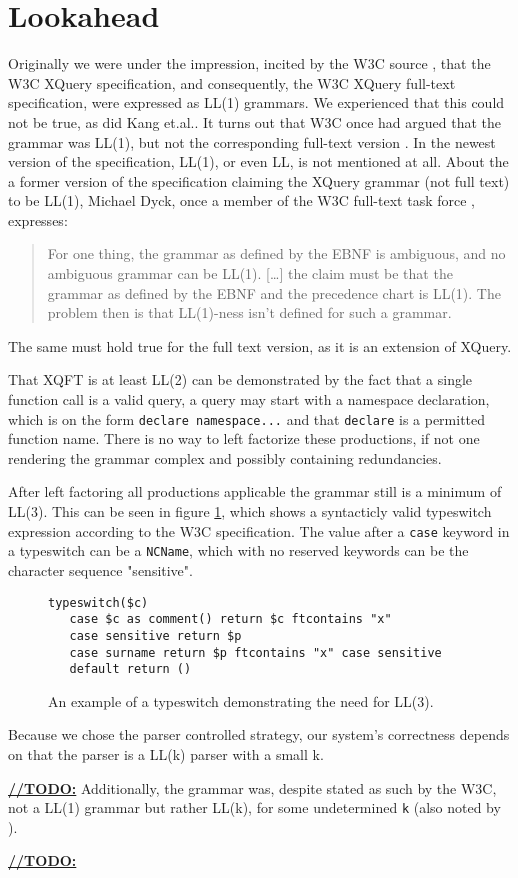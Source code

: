 \section{Lookahead}
\label{sect:discussion:lookahead}
Originally we were under the impression, incited by the W3C source \cite{createTokenizer}, that the W3C XQuery specification, and consequently, the W3C XQuery full-text specification, were expressed as LL(1) grammars. We experienced that this could not be true, as did Kang et.al.\cite{kang_xquery_diglib}. It turns out that W3C once had argued that the grammar was LL(1), but not the corresponding full-text version \cite{grammarIsLL1}. In the newest version of the specification, LL(1), or even LL, is not mentioned at all. About the a former version of the specification claiming the XQuery grammar (not full text) to be LL(1), Michael Dyck, once a member of the W3C full-text task force \cite{dyckIsTaskForce}, expresses\cite{dyckOnList}:
\begin{quote}
For one thing, the grammar as defined by the EBNF is ambiguous, and no ambiguous grammar can be LL(1). [\ldots] the claim must be that the grammar as defined by the EBNF and the precedence chart is LL(1). The problem then is that LL(1)-ness isn't defined for such a grammar.
\end{quote}
The same must hold true for the full text version, as it is an extension of XQuery.

That XQFT is at least LL(2) can be demonstrated by the fact that a single function call is a valid query, a query may start with a namespace declaration, which is on the form \verb!declare namespace...! and that \verb!declare! is a permitted function name. There is no way to left factorize these productions, if not one rendering the grammar complex and possibly containing redundancies.

After left factoring all productions applicable the grammar still is a minimum of LL(3). This can be seen in figure \ref{fig:notLL2}, which shows a syntacticly valid typeswitch expression according to the W3C specification. The value after a \verb!case! keyword in a typeswitch can be a \verb!NCName!, which with no reserved keywords can be the character sequence "sensitive".

\begin{figure}[h!]
\begin{Verbatim}
typeswitch($c) 
   case $c as comment() return $c ftcontains "x" 
   case sensitive return $p
   case surname return $p ftcontains "x" case sensitive
   default return ()
\end{Verbatim}
\label{fig:notLL2}
\caption[A typeswitch shows the need for LL(3)]{An example of a typeswitch demonstrating the need for LL(3).}
\end{figure}


Because we chose the parser controlled strategy, our system's correctness depends on that the parser is a LL(k) parser with a small k.


\underline{\textbf{\LARGE //TODO:}}
Additionally, the grammar was, despite stated as such
by the W3C, not a LL(1) grammar but rather LL(k), for some undetermined \verb!k!
(also noted by \cite{kang_xquery_diglib}).

\underline{\textbf{\LARGE //TODO:}}
